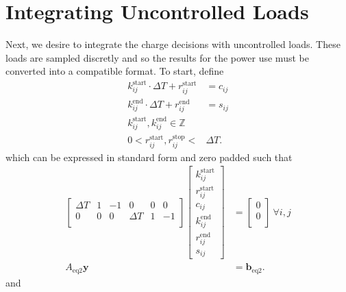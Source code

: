 \section{Integrating Uncontrolled Loads\label{sec:uncontrolled}}
Next, we desire to integrate the charge decisions with uncontrolled loads.  These loads are sampled discretly and so the results for the power use must be converted into a compatible format.  To start, define
\begin{equation} \begin{aligned}
		k^{\text{start}}_{ij}\cdot\Delta T + r^{\text{start}}_{ij}&= c_{ij} \\
		k^{\text{end}}_{ij}\cdot\Delta T + r^{\text{end}}_{ij}&= s_{ij} \\
	k^{\text{start}}_{ij}, k^{\text{end}}_{ij} \in \mathbb{Z} \\
	0 < r^{\text{start}}_{ij}, r^{\text{stop}}_{ij} < &\Delta T.
\end{aligned} \end{equation} 
which can be expressed in standard form and zero padded such that
\begin{equation} \begin{aligned}
	\begin{bmatrix}\Delta T &  1 & -1 & 0        & 0 &  0\\ 
		       0        &  0 & 0  & \Delta T & 1 & -1\\
	\end{bmatrix} 
	\begin{bmatrix} k_{ij}^{\text{start}} \\
		        r_{ij}^{\text{start}} \\
			c_{ij}                \\
			k_{ij}^{\text{end}}   \\
			r_{ij}^{\text{end}}   \\
			s_{ij}
	\end{bmatrix} &= 
	\begin{bmatrix} 0 \\
	                0 \\
	\end{bmatrix} \ \forall i,j \\ 
	A_{\text{eq2}}\mathbf{y} &= \mathbf{b}_{\text{eq2}}.
\end{aligned} \end{equation}
and 
